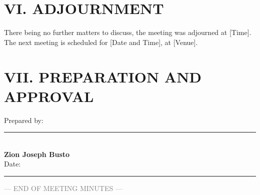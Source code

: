 \documentclass[11pt,a4paper]{article}
\begin{document}
\section*{VI. ADJOURNMENT}

There being no further matters to discuss, the meeting was adjourned at [Time]. The next meeting is scheduled for [Date and Time], at [Venue].

\section*{VII. PREPARATION AND APPROVAL}

\vspace{4pt}
\noindent
\begin{minipage}[t]{0.47\textwidth}
Prepared by:\\[28pt]
\rule{\linewidth}{0.4pt}\\
\textbf{Zion Joseph Busto}\\
Date: \rule{3cm}{0.4pt}
\end{minipage}


\vfill
\begin{center}
    {\footnotesize\textcolor{graytext}{--- END OF MEETING MINUTES ---}}
\end{center}
\end{document}
